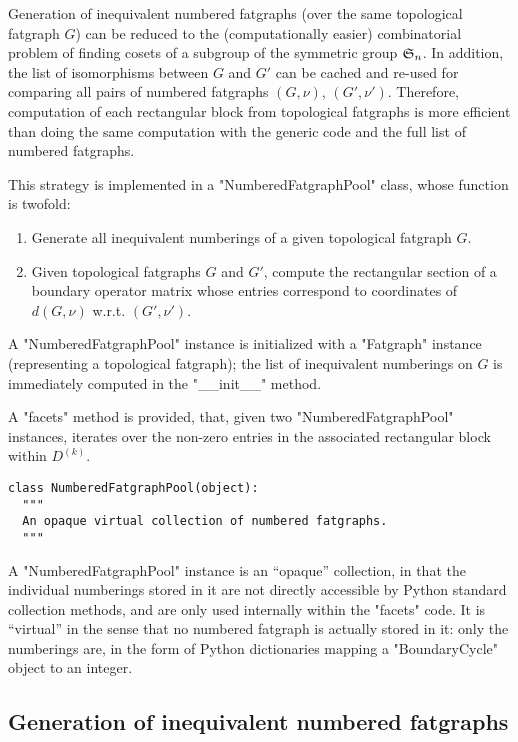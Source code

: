 Generation of inequivalent numbered fatgraphs (over the same
topological fatgraph $G$) can be reduced to the (computationally
easier) combinatorial problem of finding cosets of a subgroup of the
symmetric group $\mathfrak{S}_{n}$.  In addition, the list of isomorphisms
between $G$ and $G'$ can be cached and re-used for comparing all pairs
of numbered fatgraphs $(G,\nu)$, $(G',\nu')$.  Therefore, computation
of each rectangular block from topological fatgraphs is more efficient
than doing the same computation with the generic code and the full
list of numbered fatgraphs.

This strategy is implemented in a "NumberedFatgraphPool" class, whose
function is twofold:
\begin{enumerate}
\item\label{nfp:1} Generate all inequivalent numberings of a given
  topological fatgraph $G$.
\item\label{nfp:2} Given topological fatgraphs $G$ and $G'$, compute
  the rectangular section of a boundary operator matrix whose entries
  correspond to coordinates of $d(G,\nu)$ w.r.t. $(G',\nu')$.
\end{enumerate}

A "NumberedFatgraphPool" instance is initialized with a "Fatgraph"
instance (representing a topological fatgraph); the list of inequivalent
numberings on $G$ is immediately computed in the "__init__" method.

A "facets" method is provided, that, given two "NumberedFatgraphPool"
instances, iterates over the non-zero entries in the associated
rectangular block within $D^{(k)}$.

\begin{lstlisting}
class NumberedFatgraphPool(object):
  """
  An opaque virtual collection of numbered fatgraphs.
  """

\end{lstlisting}
A "NumberedFatgraphPool" instance is an ``opaque'' collection, in that the
individual numberings stored in it are not directly accessible by
Python standard collection methods, and are only used internally
within the "facets" code.  It is ``virtual'' in the sense that no
numbered fatgraph is actually stored in it: only the numberings are,
in the form of Python dictionaries mapping a "BoundaryCycle" object to
an integer.

\subsection{Generation of inequivalent numbered fatgraphs}
\label{sec:numberings}

